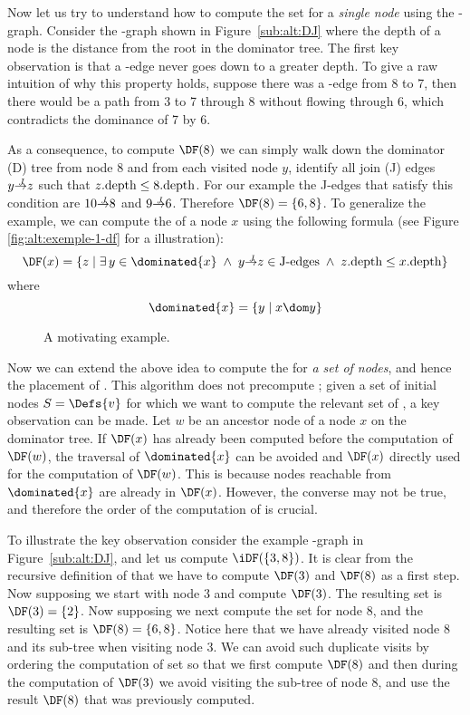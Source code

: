 {Now let us try to understand how to compute the \DF set for a \emph{single node} using the \DJ-graph. 
Consider the \DJ-graph shown in Figure~\ref{sub:alt:DJ} where the depth of a node is the distance from the root in the dominator tree. 
The first key observation is that a \DF-edge never goes down to a greater depth. 
To give a raw intuition of why this property holds, suppose there was a \DF-edge from 8 to 7, then there would be a path from 3 to 7 through 8 without flowing through 6, which contradicts the dominance of 7 by 6.


As a consequence, to compute $\DF(8)$ we can simply walk down the dominator (D) tree from node 8 and from each visited node $y$, identify all join (J) edges $y \st{J} z$ such that $z.\textrm{depth} \leq 8.\textrm{depth}$. 
For our example the J-edges that satisfy this condition are $10 \st{J} 8$ and $9 \st{J} 6$. 
Therefore $\DF(8) = \{6, 8\}$. 
To generalize the example, we can compute the \DF of a node $x$ using the following formula (see Figure \ref{fig:alt:exemple-1-df} for a illustration):
$$\DF(x) = \{z\mid\exists\, y\in\dominated{x} \; \wedge \; y \st{J} z \in \textrm{J-edges} \; \wedge \; z.\depth \leq x.\depth \}$$
where 
$$\dominated{x} = \{ y\mid x\dom y \}$$


\begin{figure}[htb]
  \caption{A motivating example.}
  \label{fig:cfg}
\end{figure} 

Now we can extend the above idea to compute the \iDF for \emph{a set of nodes}, and hence the placement of \phifuns. 
This algorithm does not precompute \DF; 
given a set of initial nodes $S=\Defs{v}$ for which we want to compute the relevant set of \phifuns, a key observation can be made. 
Let $w$ be an ancestor node of a node $x$ on the dominator tree. 
If $\DF(x)$ has already been computed before the computation of $\DF(w)$, the traversal of $\dominated{x}$ can be avoided and $\DF(x)$ directly used for the computation of $\DF(w)$. 
This is because nodes reachable from $\dominated{x}$ are already in $\DF(x)$. 
However, the converse may not be true, and therefore the order of the computation of \DF is crucial.

To illustrate the key observation consider the example \DJ-graph in Figure~\ref{sub:alt:DJ}, and let us compute $\iDF(\{3,8\})$. 
It is clear from the recursive definition of \iDF that we have to compute $\DF(3)$ and $\DF(8)$ as a first step. 
Now supposing we start with node $3$ and compute $\DF(3)$. 
The resulting \DF set is $\DF(3) = \{2\}$. 
Now supposing we next compute the \DF set for node $8$, and the resulting set is $\DF(8) = \{6,8\}$. 
Notice here that we have already visited node $8$ and its sub-tree when visiting node $3$. 
We can avoid such duplicate visits by ordering the computation of \DF set so that we first compute $\DF(8)$ and then during the computation of $\DF(3)$ we avoid visiting the sub-tree of node $8$, and use the result $\DF(8)$ that was previously computed.

}
